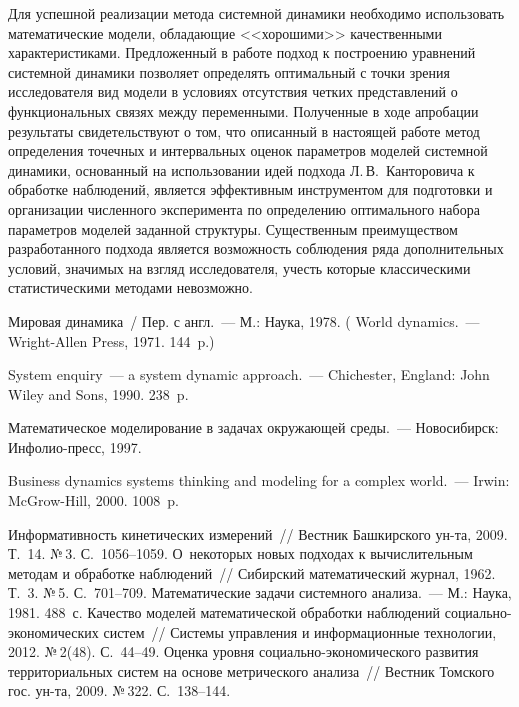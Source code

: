 {\begin{multicols}{2}
  Для успешной реализации метода системной динамики необходимо
использовать математические модели, обладающие <<хорошими>>
качественными характеристиками. Предложенный в работе подход к
построению уравнений системной динамики позволяет определять
оптимальный с точки зрения исследователя вид модели в условиях отсутствия
четких представлений о функциональных связях между переменными.
Полученные в ходе апробации результаты свидетельствуют о том, что
описанный в настоящей работе метод определения точечных и интервальных
оценок параметров моделей системной динамики, основанный на
использовании идей подхода Л.\,В.~Канторовича к обработке наблюдений,
является эффективным инструментом для подготовки и организации
численного эксперимента по определению оптимального набора параметров
моделей заданной структуры. Существенным преимуществом разработанного
подхода является возможность соблюдения ряда дополнительных условий,
значимых на взгляд исследователя, учесть которые классическими
статистическими методами невозможно.

{\small\frenchspacing
 {%
 \begin{thebibliography}{99}

  Мировая динамика~/ Пер. с англ.~--- М.: Наука, 1978.
  (
 {World dynamics}.~--- Wright-Allen Press, 1971. 144~p.)

 System enquiry~--- a system dynamic approach.~--- Chichester,
England: John Wiley and Sons, 1990. 238~p.


 Математическое моделирование в задачах окружающей среды.~---
Новосибирск: Инфолио-пресс, 1997.

 Business dynamics systems thinking and modeling for a complex
world.~--- Irwin: McGrow-Hill, 2000. 1008~p.

 Информативность кинетических измерений~// Вестник Башкирского
ун-та, 2009. Т.~14. №\,3. С.~1056--1059.
 О~некоторых новых подходах к вычислительным методам и обработке
наблюдений~// Сибирский математический журнал,
1962.  Т.~3. №\,5. С.~701--709.
 Математические задачи системного анализа.~--- М.: Наука, 1981. 488~с.
Качество моделей математической обработки наблюдений
со\-ци\-аль\-но-эко\-но\-ми\-че\-ских систем~//
Системы управления и информационные
технологии, 2012. №\,2(48). С.~44--49.
Оценка уровня  со\-ци\-аль\-но-эко\-но\-ми\-че\-ско\-го
развития территориальных систем на основе метрического анализа~//
Вестник Томского гос. ун-та, 2009. №\,322. С.~138--144.


\end{thebibliography}}}
\end{multicols}}
